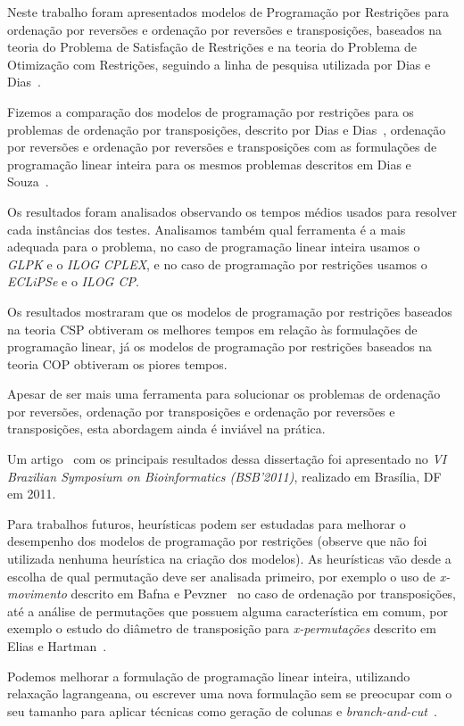 Neste trabalho foram apresentados modelos de Programação por
Restrições para ordenação por reversões e ordenação por reversões e
transposições, baseados na teoria do Problema de Satisfação de
Restrições e na teoria do Problema de Otimização com Restrições,
seguindo a linha de pesquisa utilizada por Dias e
Dias~\cite{DiasDias*2009}.

Fizemos a comparação dos modelos de programação por restrições para os
problemas de ordenação por transposições, descrito por Dias e
Dias~\cite{DiasDias*2009}, ordenação por reversões e ordenação por
reversões e transposições com as formulações de programação linear
inteira para os mesmos problemas descritos em Dias e
Souza~\cite{DiasSouza*2007}.

Os resultados foram analisados observando os tempos médios usados para
resolver cada instâncias dos testes. Analisamos também qual ferramenta
é a mais adequada para o problema, no caso de programação linear
inteira usamos o \textit{GLPK} e o \textit{ILOG CPLEX}, e no caso de
programação por restrições usamos o \textit{ECLiPSe} e o \textit{ILOG
CP}.

Os resultados mostraram que os modelos de programação por restrições
baseados na teoria CSP obtiveram os melhores tempos em relação às
formulações de programação linear, já os modelos de programação por
restrições baseados na teoria COP obtiveram os piores tempos.

Apesar de ser mais uma ferramenta para solucionar os problemas de
ordenação por reversões, ordenação por transposições e ordenação por
reversões e transposições, esta abordagem ainda é inviável na
prática.

Um artigo~\cite{IizukaDias*2011} com os principais resultados dessa
dissertação foi apresentado no \textit{VI Brazilian Symposium on
Bioinformatics (BSB'2011)}, realizado em Brasília, DF em 2011.

Para trabalhos futuros, heurísticas podem ser estudadas para melhorar
o desempenho dos modelos de programação por restrições (observe que
não foi utilizada nenhuma heurística na criação dos modelos). As
heurísticas vão desde a escolha de qual permutação deve ser analisada
primeiro, por exemplo o uso de \textit{x-movimento} descrito em Bafna
e Pevzner~\cite{BafnaPevzner*1998} no caso de ordenação por
transposições, até a análise de permutações que possuem alguma
característica em comum, por exemplo o estudo do diâmetro de
transposição para \textit{x-permutações} descrito em Elias e
Hartman~\cite{EliasHartman*2006}.

Podemos melhorar a formulação de programação linear inteira,
utilizando relaxação lagrangeana, ou escrever uma nova formulação sem
se preocupar com o seu tamanho para aplicar técnicas como geração de
colunas
e \textit{branch-and-cut}~\cite{NemhauserWolsey*1988,Wolsey*1998}.
